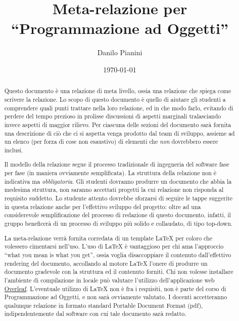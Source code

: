 \documentclass[a4paper,12pt]{report}
\title{Meta-relazione per\\``Programmazione ad Oggetti''}
\author{Danilo Pianini}
\date{\today}
\begin{document}
 
\maketitle

\begin{abstract}
Questo documento è una relazione di meta livello, ossia una relazione che spiega come scrivere la relazione.
%
Lo scopo di questo documento è quello di aiutare gli studenti a comprendere quali punti trattare nella loro relazione, ed in che modo farlo, evitando di perdere del tempo prezioso in prolisse discussioni di aspetti marginali tralasciando invece aspetti di maggior rilievo.
%
Per ciascuna delle sezioni del documento sarà fornita una descrizione di ciò che ci si aspetta venga prodotto dal team di sviluppo, assieme ad un elenco (per forza di cose non esaustivo) di elementi che \emph{non} dovrebbero essere inclusi.

Il modello della relazione segue il processo tradizionale di ingegneria del software fase per fase (in maniera ovviamente semplificata).
%
La struttura della relazione non è indicativa ma \textit{obbligatoria}.
%
Gli studenti dovranno produrre un documento che abbia la medesima struttura, non saranno accettati progetti la cui relazione non risponda al requisito suddetto.
%
Lo studente attento dovrebbe sforzarsi di seguire le tappe suggerite in questa relazione anche per l'effettivo sviluppo del progetto: oltre ad una considerevole semplificazione del processo di redazione di questo documento, infatti, il gruppo beneficerà di un processo di sviluppo più solido e collaudato, di tipo top-down.

La meta-relazione verrà fornita corredata di un template \LaTeX{} per coloro che volessero cimentarsi nell'uso.
%
L'uso di \LaTeX{} è vantaggioso per chi ama l'approccio ``what you mean is what you get'', ossia voglia disaccoppiare il contenuto dall'effettivo rendering del documento, accollando al motore \LaTeX{} l'onere di produrre un documento gradevole con la struttura ed il contenuto forniti.
%
Chi non volesse installare l'ambiente di compilazione in locale può valutare l'utilizzo dell'applicazione web \href{https://www.overleaf.com/}{Overleaf}.
%
L'eventuale utilizzo di \LaTeX{} non è fra i requisiti, non è parte del corso di Programmazione ad Oggetti, e non sarà ovviamente valutato. I docenti accetteranno qualunque relazione in formato standard Portable Document Format (pdf), indipendentemente dal software con cui tale documento sarà redatto.
\end{abstract}
\end{document}
